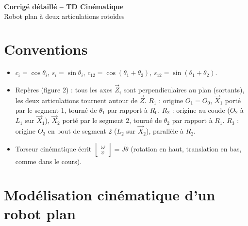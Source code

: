 \documentclass[11pt,a4paper]{article}
\begin{document}
\begin{center}{\LARGE\bfseries Corrigé détaillé -- TD Cinématique}\\[4pt]{\large Robot plan à deux articulations rotoïdes}\end{center}

\section*{Conventions}
\begin{itemize}
\item $c_i=\cos\theta_i$, $s_i=\sin\theta_i$, $c_{12}=\cos(\theta_1+\theta_2)$, $s_{12}=\sin(\theta_1+\theta_2)$.
\item Repères (figure 2) : tous les axes $\vec Z_i$ sont perpendiculaires au plan (sortants), les deux articulations tournent autour de $\vec Z$.
$R_1$ : origine $O_1=O_0$, $\vec X_1$ porté par le segment 1, tourné de $\theta_1$ par rapport à $R_0$.
$R_2$ : origine au coude ($O_2$ à $L_1$ sur $\vec X_1$), $\vec X_2$ porté par le segment 2, tourné de $\theta_2$ par rapport à $R_1$.
$R_3$ : origine $O_3$ en bout de segment 2 ($L_2$ sur $\vec X_2$), parallèle à $R_2$.
\item Torseur cinématique écrit $\begin{bmatrix}\omega\\v\end{bmatrix}=J\dot\theta$ (rotation en haut, translation en bas, comme dans le cours).
\end{itemize}

\section{Modélisation cinématique d'un robot plan}
\end{document}

